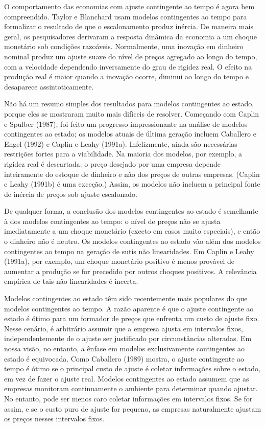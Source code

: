 \documentclass[a4paper,12pt]{article}[abntex2]
\begin{document}
O comportamento das economias com ajuste contingente ao tempo é agora bem compreendido. Taylor e Blanchard usam modelos contingentes ao tempo para formalizar o resultado de que o escalonamento produz inércia. De maneira mais geral, os pesquisadores derivaram a resposta dinâmica da economia a um choque monetário sob condições razoáveis. Normalmente, uma inovação em dinheiro nominal produz um ajuste suave do nível de preços agregado ao longo do tempo, com a velocidade dependendo inversamente do grau de rigidez real. O efeito na produção real é maior quando a inovação ocorre, diminui ao longo do tempo e desaparece assintoticamente.

Não há um resumo simples dos resultados para modelos contingentes ao estado, porque eles se mostraram muito mais difíceis de resolver. Começando com Caplin e Spulber (1987), foi feito um progresso impressionante na análise de modelos contingentes ao estado; os modelos atuais de última geração incluem Caballero e Engel (1992) e Caplin e Leahy (1991a). Infelizmente, ainda são necessárias restrições fortes para a viabilidade. Na maioria dos modelos, por exemplo, a rigidez real é descartada: o preço desejado por uma empresa depende inteiramente do estoque de dinheiro e não dos preços de outras empresas. (Caplin e Leahy (1991b) é uma exceção.) Assim, os modelos não incluem a principal fonte de inércia de preços sob ajuste escalonado.

De qualquer forma, a conclusão dos modelos contingentes ao estado é semelhante à dos modelos contingentes ao tempo: o nível de preços não se ajusta imediatamente a um choque monetário (exceto em casos muito especiais), e então o dinheiro não é neutro. Os modelos contingentes ao estado vão além dos modelos contingentes ao tempo na geração de sutis não linearidades. Em Caplin e Leahy (1991a), por exemplo, um choque monetário positivo é menos provável de aumentar a produção se for precedido por outros choques positivos. A relevância empírica de tais não linearidades é incerta.

Modelos contingentes ao estado têm sido recentemente mais populares do que modelos contingentes ao tempo. A razão aparente é que o ajuste contingente ao estado é ótimo para um formador de preços que enfrenta um custo de ajuste fixo. Nesse cenário, é arbitrário assumir que a empresa ajusta em intervalos fixos, independentemente de o ajuste ser justificado por circunstâncias alteradas. Em nossa visão, no entanto, a ênfase em modelos exclusivamente contingentes ao estado é equivocada. Como Caballero (1989) mostra, o ajuste contingente ao tempo é ótimo se o principal custo de ajuste é coletar informações sobre o estado, em vez de fazer o ajuste real. Modelos contingentes ao estado assumem que as empresas monitoram continuamente o ambiente para determinar quando ajustar. No entanto, pode ser menos caro coletar informações em intervalos fixos. Se for assim, e se o custo puro de ajuste for pequeno, as empresas naturalmente ajustam os preços nesses intervalos fixos.
\end{document}
